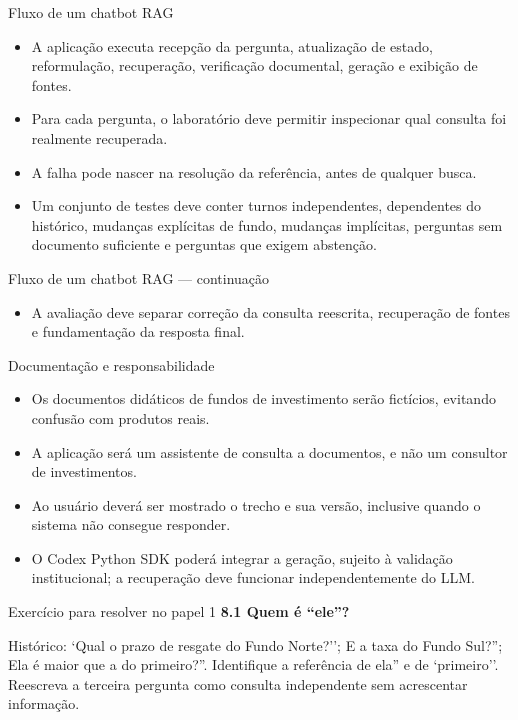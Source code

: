 \documentclass[10pt,aspectratio=169]{beamer}
\begin{document}
\begin{frame}[t]{Fluxo de um chatbot RAG}
\small
\begin{itemize}
\item A aplicação executa recepção da pergunta, atualização de estado, reformulação, recuperação, verificação documental, geração e exibição de fontes.
\item Para cada pergunta, o laboratório deve permitir inspecionar qual consulta foi realmente recuperada.
\item A falha pode nascer na resolução da referência, antes de qualquer busca.
\item Um conjunto de testes deve conter turnos independentes, dependentes do histórico, mudanças explícitas de fundo, mudanças implícitas, perguntas sem documento suficiente e perguntas que exigem abstenção.
\end{itemize}
\end{frame}

\begin{frame}[t]{Fluxo de um chatbot RAG — continuação}
\small
\begin{itemize}
\item A avaliação deve separar correção da consulta reescrita, recuperação de fontes e fundamentação da resposta final.
\end{itemize}
\end{frame}

\begin{frame}[t]{Documentação e responsabilidade}
\small
\begin{itemize}
\item Os documentos didáticos de fundos de investimento serão fictícios, evitando confusão com produtos reais.
\item A aplicação será um assistente de consulta a documentos, e não um consultor de investimentos.
\item Ao usuário deverá ser mostrado o trecho e sua versão, inclusive quando o sistema não consegue responder.
\item O Codex Python SDK poderá integrar a geração, sujeito à validação institucional; a recuperação deve funcionar independentemente do LLM.
\end{itemize}
\end{frame}

\begin{frame}[t]{Exercício para resolver no papel 1}
\small
\small\textbf{8.1 Quem é ``ele''?}\par\vspace{4mm}Histórico: `Qual o prazo de resgate do Fundo Norte?''; E a taxa do Fundo Sul?''; Ela é maior que a do primeiro?''. Identifique a referência de ela'' e de `primeiro''. Reescreva a terceira pergunta como consulta independente sem acrescentar informação.
\end{frame}
\end{document}
